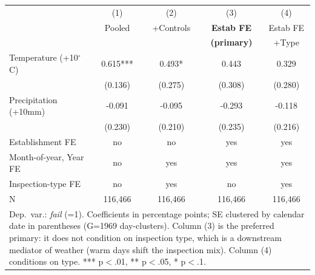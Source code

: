 \begin{tabular}{lcccc}
\hline\hline
 & (1) & (2) & (3) & (4) \\
 & Pooled & +Controls & \textbf{Estab FE} & Estab FE \\
 &  &  & \textbf{(primary)} & +Type \\
\hline
Temperature (+10$^\circ$C) & 0.615*** & 0.493* & 0.443 & 0.329 \\
 & (0.136) & (0.275) & (0.308) & (0.280) \\
Precipitation (+10mm) & -0.091 & -0.095 & -0.293 & -0.118 \\
 & (0.230) & (0.210) & (0.235) & (0.216) \\
\hline
Establishment FE & no & no & yes & yes \\
Month-of-year, Year FE & no & yes & yes & yes \\
Inspection-type FE & no & yes & no & yes \\
N & 116,466 & 116,466 & 116,466 & 116,466 \\
\hline\hline
\multicolumn{5}{p{0.92\linewidth}}{\footnotesize Dep.\ var.: \emph{fail} (=1). Coefficients in percentage points; SE clustered by calendar date in parentheses (G=1969 day-clusters). Column (3) is the preferred primary: it does not condition on inspection type, which is a downstream mediator of weather (warm days shift the inspection mix). Column (4) conditions on type. *** p$<$.01, ** p$<$.05, * p$<$.1.}\\
\end{tabular}